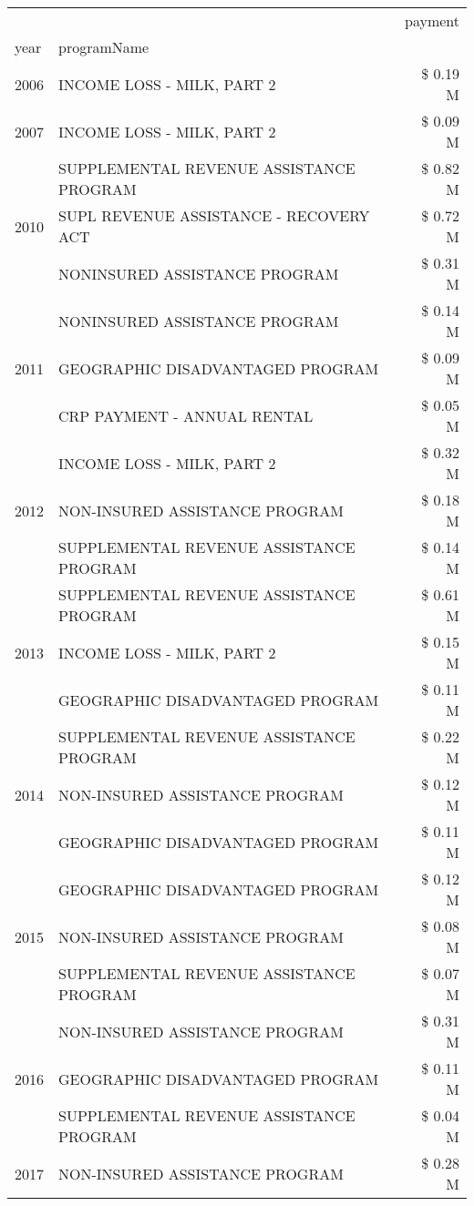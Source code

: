\begin{tabular}{llr}
\toprule
 &  & payment \\
year & programName &  \\
\midrule
2006 & INCOME LOSS - MILK, PART 2 & \$ 0.19 M \\
\cline{1-3}
2007 & INCOME LOSS - MILK, PART 2 & \$ 0.09 M \\
\cline{1-3}
\multirow[t]{3}{*}{2010} & SUPPLEMENTAL REVENUE ASSISTANCE PROGRAM & \$ 0.82 M \\
 & SUPL REVENUE ASSISTANCE - RECOVERY ACT & \$ 0.72 M \\
 & NONINSURED ASSISTANCE PROGRAM & \$ 0.31 M \\
\cline{1-3}
\multirow[t]{3}{*}{2011} & NONINSURED ASSISTANCE PROGRAM & \$ 0.14 M \\
 & GEOGRAPHIC DISADVANTAGED PROGRAM & \$ 0.09 M \\
 & CRP PAYMENT - ANNUAL RENTAL & \$ 0.05 M \\
\cline{1-3}
\multirow[t]{3}{*}{2012} & INCOME LOSS - MILK, PART 2 & \$ 0.32 M \\
 & NON-INSURED ASSISTANCE PROGRAM & \$ 0.18 M \\
 & SUPPLEMENTAL REVENUE ASSISTANCE PROGRAM & \$ 0.14 M \\
\cline{1-3}
\multirow[t]{3}{*}{2013} & SUPPLEMENTAL REVENUE ASSISTANCE PROGRAM & \$ 0.61 M \\
 & INCOME LOSS - MILK, PART 2 & \$ 0.15 M \\
 & GEOGRAPHIC DISADVANTAGED PROGRAM & \$ 0.11 M \\
\cline{1-3}
\multirow[t]{3}{*}{2014} & SUPPLEMENTAL REVENUE ASSISTANCE PROGRAM & \$ 0.22 M \\
 & NON-INSURED ASSISTANCE PROGRAM & \$ 0.12 M \\
 & GEOGRAPHIC DISADVANTAGED PROGRAM & \$ 0.11 M \\
\cline{1-3}
\multirow[t]{3}{*}{2015} & GEOGRAPHIC DISADVANTAGED PROGRAM & \$ 0.12 M \\
 & NON-INSURED ASSISTANCE PROGRAM & \$ 0.08 M \\
 & SUPPLEMENTAL REVENUE ASSISTANCE PROGRAM & \$ 0.07 M \\
\cline{1-3}
\multirow[t]{3}{*}{2016} & NON-INSURED ASSISTANCE PROGRAM & \$ 0.31 M \\
 & GEOGRAPHIC DISADVANTAGED PROGRAM & \$ 0.11 M \\
 & SUPPLEMENTAL REVENUE ASSISTANCE PROGRAM & \$ 0.04 M \\
\cline{1-3}
\multirow[t]{3}{*}{2017} & NON-INSURED ASSISTANCE PROGRAM & \$ 0.28 M \\

\end{tabular}
